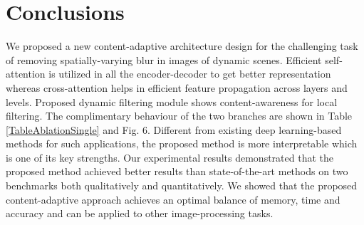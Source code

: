 \documentclass[10pt,twocolumn,letterpaper]{article}
\begin{document}
\section{Conclusions}
We proposed a new content-adaptive architecture design for the challenging task of removing spatially-varying blur in images of dynamic scenes. Efficient self-attention is utilized in all the encoder-decoder to get better representation whereas cross-attention helps in efficient feature propagation across layers and levels. Proposed dynamic filtering module shows content-awareness for local filtering. The complimentary behaviour of the two branches are shown in Table \ref{TableAblationSingle} and Fig. 6. Different from existing deep learning-based methods for such applications, the proposed method is more interpretable which is one of its key strengths. Our experimental results demonstrated that the proposed method achieved better results than state-of-the-art methods on two benchmarks both qualitatively and quantitatively. We showed that the proposed content-adaptive approach achieves an optimal balance of memory, time and accuracy and can be applied to other image-processing tasks. 





{\small


}
\end{document}
